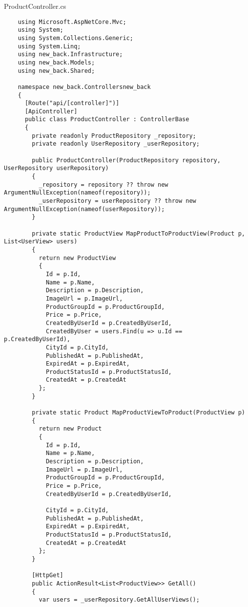 ProductController.cs
\lstset{style=sharpc}
\begin{lstlisting}
    using Microsoft.AspNetCore.Mvc;
    using System;
    using System.Collections.Generic;
    using System.Linq;
    using new_back.Infrastructure;
    using new_back.Models;
    using new_back.Shared;
    
    namespace new_back.Controllersnew_back
    {
      [Route("api/[controller]")]
      [ApiController]
      public class ProductController : ControllerBase
      {
        private readonly ProductRepository _repository;
        private readonly UserRepository _userRepository;
    
        public ProductController(ProductRepository repository, UserRepository userRepository)
        {
          _repository = repository ?? throw new ArgumentNullException(nameof(repository));
          _userRepository = userRepository ?? throw new ArgumentNullException(nameof(userRepository));
        }
    
        private static ProductView MapProductToProductView(Product p, List<UserView> users)
        {
          return new ProductView
          {
            Id = p.Id,
            Name = p.Name,
            Description = p.Description,
            ImageUrl = p.ImageUrl,
            ProductGroupId = p.ProductGroupId,
            Price = p.Price,
            CreatedByUserId = p.CreatedByUserId,
            CreatedByUser = users.Find(u => u.Id == p.CreatedByUserId),
            CityId = p.CityId,
            PublishedAt = p.PublishedAt,
            ExpiredAt = p.ExpiredAt,
            ProductStatusId = p.ProductStatusId,
            CreatedAt = p.CreatedAt
          };
        }
        
        private static Product MapProductViewToProduct(ProductView p)
        {
          return new Product
          {
            Id = p.Id,
            Name = p.Name,
            Description = p.Description,
            ImageUrl = p.ImageUrl,
            ProductGroupId = p.ProductGroupId,
            Price = p.Price,
            CreatedByUserId = p.CreatedByUserId,
            
            CityId = p.CityId,
            PublishedAt = p.PublishedAt,
            ExpiredAt = p.ExpiredAt,
            ProductStatusId = p.ProductStatusId,
            CreatedAt = p.CreatedAt
          };
        }
    
        [HttpGet]
        public ActionResult<List<ProductView>> GetAll()
        {
          var users = _userRepository.GetAllUserViews();
          

\end{lstlisting}
